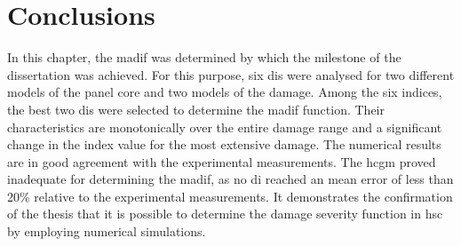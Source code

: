 \section{Conclusions}
\label{sec:conclusionsSever}

In this chapter, the \ac{madif} was determined by which the milestone of the dissertation was achieved.
For this purpose, six \acp{di} were analysed for two different models of the panel core and two models of the damage.
Among the six indices, the best two \acp{di} were selected to determine the \ac{madif} function.
Their characteristics are monotonically over the entire damage range and a significant change in the index value for the most extensive damage.
The numerical results are in good agreement with the experimental measurements.
The \ac{hcgm} proved inadequate for determining the \ac{madif}, as no \ac{di} reached an mean error of less than 20\% relative to the experimental measurements.
It demonstrates the confirmation of the thesis that it is possible to determine the damage severity function in \ac{hsc} by employing numerical simulations.